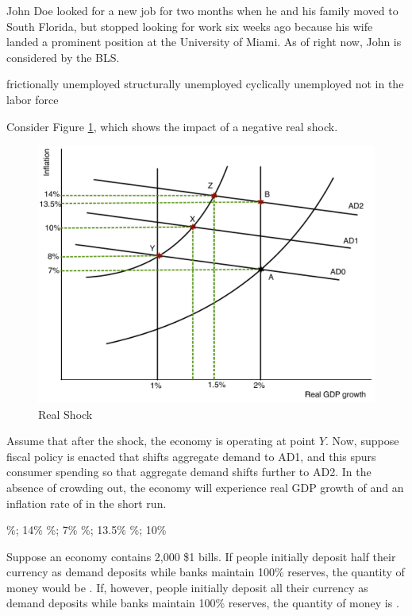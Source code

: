 \documentclass[addpoints,11pt]{exam}
\theoremstyle{definition}
\newcommand{\blank}[0]{\underline{\hspace{3cm}}}
\begin{document}
\begin{questions}
	
	\question John Doe looked for a new job for two months when he and his family moved to South Florida, but stopped looking for work six weeks ago because his wife landed a prominent position at the University of Miami. As of right now, John is considered \blank by the BLS.
	
	\begin{choices}
		\choice frictionally unemployed
		\choice structurally unemployed 
		\choice cyclically unemployed
		\CorrectChoice not in the labor force
	\end{choices}
	
	
	\question Consider Figure \ref{MC33}, which shows the impact of a negative real shock.
	
	
	\begin{figure}[H]
		\centering
		\includegraphics[scale=.38]{ec2_plot1.pdf}
		\caption{Real Shock}
		\label{MC33}
	\end{figure}
	
	Assume that after the shock, the economy is operating at point $Y$. Now, suppose fiscal policy is enacted that shifts aggregate demand to AD1, and this spurs consumer spending so that aggregate demand shifts further to AD2. In the absence of crowding out, the economy will experience real GDP growth of \blank and an inflation rate of \blank in the short run.
	
	\begin{choices}
		\%; 14\%
		\%; 7\%
		\%; 13.5\%
		\%; 10\%
	\end{choices}
	
	\question Suppose an economy contains 2,000 \$1 bills. If people initially deposit half their currency as demand deposits while banks maintain 100\% reserves, the quantity of money would be \blank. If, however, people initially deposit all their currency as demand deposits while banks maintain 100\% reserves, the quantity of money is \blank.
	

\end{questions}
\end{document}
